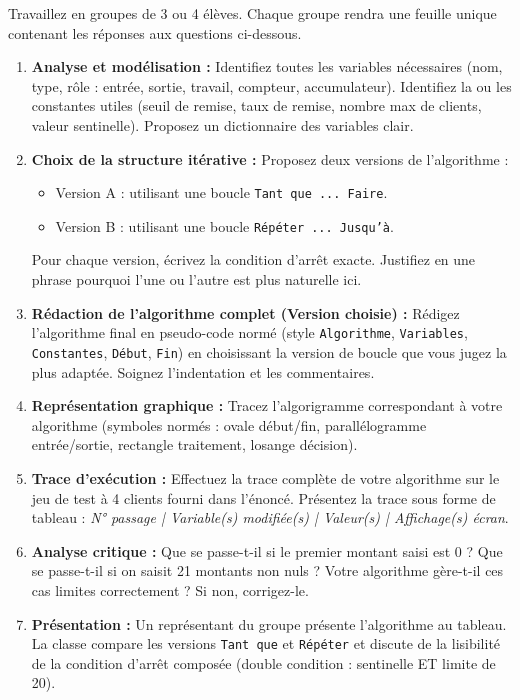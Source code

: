 \documentclass[11pt]{article}
\newcommand{\cle}[1]{{\popxbold\color{popdark}#1}}
\newcounter{popsec}
\newcounter{popsub}
\newcommand{\courssub}[1]{%
  \stepcounter{popsub}%
  \par\vspace{9pt}\noindent{\popxbold\fontsize{11.5}{13}\selectfont\color{popink}{\color{poporange}\thepopsec.\thepopsub}\hspace{6pt}#1}\par\nopagebreak\vspace{4pt}
}
\begin{document}
\courssub{Consignes de l'activité}
Travaillez en groupes de 3 ou 4 élèves. Chaque groupe rendra une feuille unique contenant les réponses aux questions ci-dessous.

\begin{enumerate}
    \item \textbf{Analyse et modélisation :} Identifiez toutes les \cle{variables} nécessaires (nom, type, rôle : entrée, sortie, travail, compteur, accumulateur). Identifiez la ou les \cle{constantes} utiles (seuil de remise, taux de remise, nombre max de clients, valeur sentinelle). Proposez un \cle{dictionnaire des variables} clair.
    \item \textbf{Choix de la structure itérative :} Proposez deux versions de l'algorithme :
    \begin{itemize}
        \item Version A : utilisant une boucle \texttt{Tant que ... Faire}.
        \item Version B : utilisant une boucle \texttt{Répéter ... Jusqu'à}.
    \end{itemize}
    Pour chaque version, écrivez la condition d'arrêt exacte. Justifiez en une phrase pourquoi l'une ou l'autre est plus naturelle ici.
    \item \textbf{Rédaction de l'algorithme complet (Version choisie) :} Rédigez l'algorithme final en pseudo-code normé (style \texttt{Algorithme}, \texttt{Variables}, \texttt{Constantes}, \texttt{Début}, \texttt{Fin}) en choisissant la version de boucle que vous jugez la plus adaptée. Soignez l'indentation et les commentaires.
    \item \textbf{Représentation graphique :} Tracez l'algorigramme correspondant à votre algorithme (symboles normés : ovale début/fin, parallélogramme entrée/sortie, rectangle traitement, losange décision).
    \item \textbf{Trace d'exécution :} Effectuez la trace complète de votre algorithme sur le jeu de test à 4 clients fourni dans l'énoncé. Présentez la trace sous forme de tableau : \textit{N° passage | Variable(s) modifiée(s) | Valeur(s) | Affichage(s) écran}.
    \item \textbf{Analyse critique :} Que se passe-t-il si le premier montant saisi est 0 ? Que se passe-t-il si on saisit 21 montants non nuls ? Votre algorithme gère-t-il ces cas limites correctement ? Si non, corrigez-le.
    \item \textbf{Présentation :} Un représentant du groupe présente l'algorithme au tableau. La classe compare les versions \texttt{Tant que} et \texttt{Répéter} et discute de la lisibilité de la condition d'arrêt composée (double condition : sentinelle ET limite de 20).
\end{enumerate}
\end{document}
